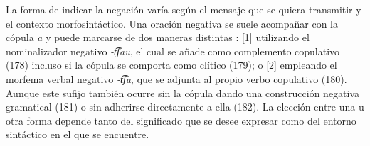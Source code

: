 La forma de indicar la negación varía según el mensaje que se quiera transmitir y el contexto morfosintáctico. Una oración negativa se suele acompañar con la cópula {\setmainfont{Charis SIL} \textit{a}} y puede marcarse de dos maneras distintas \textcolor{MidnightBlue}{\citep{wampis}}: [1] utilizando el nominalizador negativo {\setmainfont{Charis SIL} \textit{-t͡ʃau}}, el cual se añade como complemento copulativo (178) incluso si la cópula se comporta como clítico (179); o [2] empleando el morfema verbal negativo {\setmainfont{Charis SIL} \textit{-t͡ʃa}}, que se adjunta al propio verbo copulativo (180). Aunque este sufijo también ocurre sin la cópula dando una construcción negativa gramatical (181) o sin adherirse directamente a ella (182). La elección entre una u otra forma depende tanto del significado que se desee expresar como del entorno sintáctico en el que se encuentre.